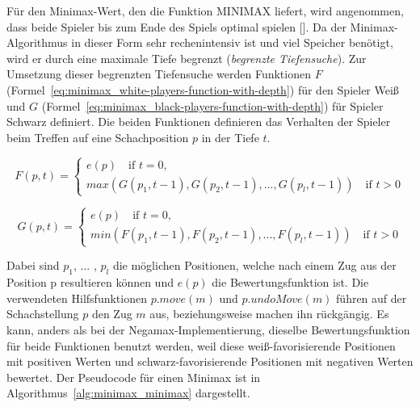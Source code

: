 Für den Minimax-Wert, den die Funktion $\text{MINIMAX}$ liefert, wird angenommen, dass beide Spieler bis zum Ende des Spiels optimal spielen [\cite{Russell2010}].
Da der Minimax-Algorithmus in dieser Form sehr rechenintensiv ist und viel Speicher benötigt, wird er durch eine maximale Tiefe begrenzt (\textit{begrenzte Tiefensuche}).
Zur Umsetzung dieser begrenzten Tiefensuche werden Funktionen $F$ (Formel~\ref{eq:minimax_white-players-function-with-depth}) für den Spieler Weiß und $G$ (Formel~\ref{eq:minimax_black-players-function-with-depth}) für Spieler Schwarz definiert.
Die beiden Funktionen definieren das Verhalten der Spieler beim Treffen auf eine Schachposition $p$ in der Tiefe $t$.

\begin{equation} \label{eq:minimax_white-players-function-with-depth}
    F(p, t) =
    \begin{cases}
        e(p) \quad \text{if } t = 0,\\
        max(G(p_1, t - 1), G(p_2, t - 1), ... , G(p_l, t - 1)) \quad \text{if } t > 0
    \end{cases}
\end{equation}

\begin{equation} \label{eq:minimax_black-players-function-with-depth}
    G(p, t) =
    \begin{cases}
        e(p) \quad \text{if } t = 0,\\
        min(F(p_1, t - 1), F(p_2, t - 1), ... , F(p_l, t - 1)) \quad \text{if } t > 0
    \end{cases}
\end{equation}

Dabei sind $p_1$, ... , $p_l$ die möglichen Positionen, welche nach einem Zug aus der Position p resultieren können und $e(p)$ die Bewertungsfunktion ist.
Die verwendeten Hilfsfunktionen $p.move(m)$ und $p.undoMove(m)$ führen auf der Schachstellung $p$ den Zug $m$ aus, beziehungsweise machen ihn rückgängig.
Es kann, anders als bei der Negamax-Implementierung, dieselbe Bewertungsfunktion für beide Funktionen benutzt werden, weil diese weiß-favorisierende Positionen mit positiven Werten und schwarz-favorisierende Positionen mit negativen Werten bewertet.
Der Pseudocode für einen Minimax ist in Algorithmus~\ref{alg:minimax_minimax} dargestellt.

